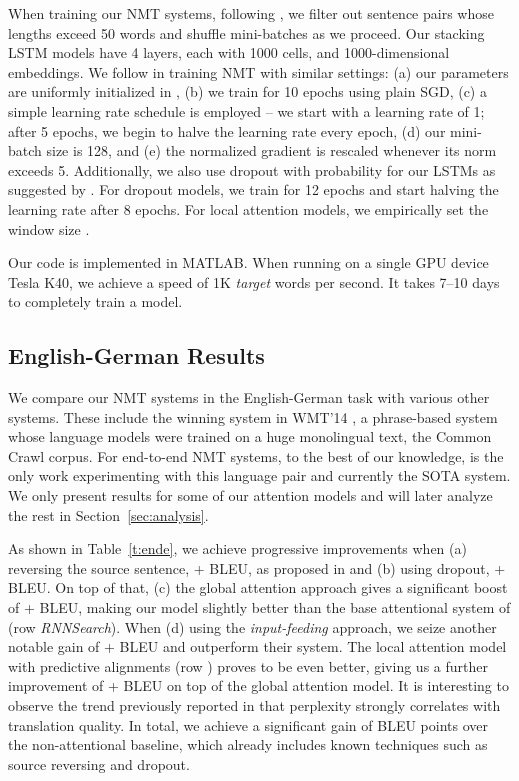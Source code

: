 \documentclass[11pt,a4paper]{article}
\begin{document}
When training our NMT systems, following \cite{bog15,jean15}, we filter out
sentence pairs whose lengths exceed 50 words and shuffle mini-batches as we
proceed. Our stacking LSTM models have 4 layers, each with 1000 cells, and
1000-dimensional embeddings. We follow \cite{sutskever14,luong15} in training
NMT with similar settings: (a) our parameters are uniformly initialized in
, (b) we train for 10 epochs using plain SGD, (c) a simple learning
rate schedule is employed -- we start with a learning rate of 1; after 5 epochs,
we begin to halve the learning rate every epoch, (d) our mini-batch size is 128,
and (e) the normalized gradient is rescaled whenever its norm exceeds 5.
Additionally, we also use dropout with probability  for our LSTMs as suggested by
\cite{zaremba15}. For dropout models, we train for 12 epochs and start halving
the learning rate after 8 epochs. For local
attention models, we empirically set the window size .

Our code is implemented in MATLAB. When running on a single GPU device Tesla K40, we achieve a speed of 1K {\it
target} words per second. It takes 7--10 days to completely train a model.

\subsection{English-German Results}
We compare our NMT systems in the English-German task with various other
systems. These include the winning system in WMT'14
\cite{buck14}, a phrase-based system whose language models were trained on a
huge monolingual text, the Common Crawl corpus. For end-to-end NMT systems, to the best of our knowledge, \cite{jean15} is the only work experimenting with this language pair and currently the SOTA system.
We only present results for some of our attention models and will later
analyze the rest in Section~\ref{sec:analysis}. 

As shown in Table~\ref{t:ende}, we achieve progressive improvements when
(a) reversing the source sentence, + BLEU, as proposed in \cite{sutskever14}
and (b) using dropout, + BLEU. On top of that, (c) the global
attention approach gives a significant boost of + BLEU, making 
 our model slightly better than the base attentional system of
  (row {\it RNNSearch}). When (d) using the {\it input-feeding}
approach, we seize another notable gain of + BLEU and outperform their
system. The local attention model with predictive alignments (row {\it \localp}) proves
to be even better, giving us a further improvement of + BLEU on top of the
global attention model. 
It is interesting to observe the trend previously reported in
\cite{luong15} that perplexity strongly correlates with translation quality.
In total, we achieve a significant gain of
\attngain{} BLEU points over the non-attentional baseline, which already includes
known techniques such as source reversing and dropout.
\end{document}
